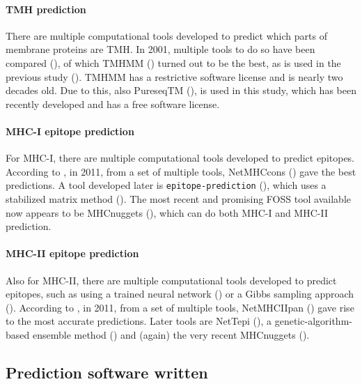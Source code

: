 \paragraph{TMH prediction}

There are multiple computational tools developed to predict which
parts of membrane proteins are TMH.
In 2001, multiple tools to do so have been compared (\cite{moller2001evaluation}),
of which TMHMM (\cite{krogh2001predicting}) turned out to be the best, 
as is used in the previous study (\cite{bianchi2017}).
TMHMM has a restrictive software license and is nearly two
decades old.
Due to this, also PureseqTM (\cite{wang2019efficient}),
is used in this study, which has been recently developed
and has a free software license.

\paragraph{MHC-I epitope prediction}

For MHC-I, there are multiple computational tools developed 
to predict epitopes. 
According to \cite{lundegaard2011prediction}, in 2011,
from a set of multiple tools, 
NetMHCcons (\cite{karosiene2012netmhccons}) gave the best predictions.
A tool developed later is \verb;epitope-prediction; (\cite{bianchi2017}),
which uses a stabilized matrix method (\cite{kim2009derivation}).
The most recent and promising FOSS tool available now appears
to be MHCnuggets (\cite{shao2020high}), which can do both MHC-I 
and MHC-II prediction.

\paragraph{MHC-II epitope prediction}

Also for MHC-II, there are multiple computational tools developed 
to predict epitopes,
such as using a trained neural network (\cite{nielsen2003reliable})
or a Gibbs sampling approach (\cite{nielsen2004improved}).
According to \cite{lundegaard2011prediction}, in 2011,
from a set of multiple tools, 
NetMHCIIpan (\cite{nielsen2008quantitative,karosiene2013netmhciipan})
gave rise to the most accurate predictions.
Later tools are NetTepi (\cite{trolle2014nettepi}),
a genetic-algorithm-based ensemble method (\cite{zhang2015accurate})
and (again) the very recent MHCnuggets (\cite{shao2020high}).

\subsection{Prediction software written}

